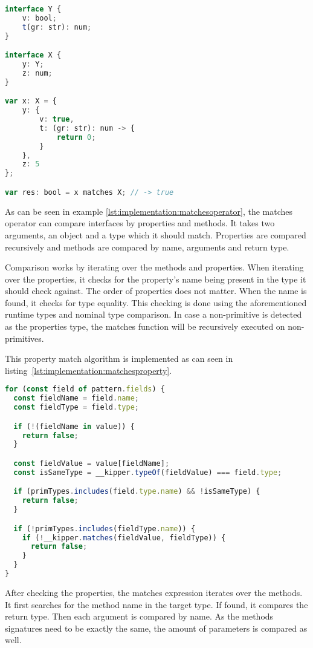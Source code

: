 \begin{lstlisting}[language=Typescript,caption=The Kipper matches operator,label=lst:implementation:matchesoperator]
interface Y {
	v: bool;
	t(gr: str): num;
}

interface X {
	y: Y;
	z: num;
}

var x: X = {
	y: {
		v: true,
		t: (gr: str): num -> {
			return 0;
		}
	},
	z: 5
};

var res: bool = x matches X; // -> true
\end{lstlisting}

As can be seen in example \ref{lst:implementation:matchesoperator}, the matches operator can compare interfaces by properties and methods. It takes two arguments, an object and a type which it should match. Properties are compared recursively and methods are compared by name, arguments and return type.

Comparison works by iterating over the methods and properties. When iterating over the properties, it checks for the property's name being present in the type it should check against. The order of properties does not matter. When the name is found, it checks for type equality. This checking is done using the aforementioned runtime types and nominal type comparison. In case a non-primitive is detected as the properties type, the matches function will be recursively executed on non-primitives.

This property match algorithm is implemented as can seen in listing~\ref{lst:implementation:matchesproperty}.

\begin{lstlisting}[language=Typescript,caption=Matches operator property comparison,label=lst:implementation:matchesproperty]
for (const field of pattern.fields) {
  const fieldName = field.name;
  const fieldType = field.type;

  if (!(fieldName in value)) {
    return false;
  }

  const fieldValue = value[fieldName];
  const isSameType = __kipper.typeOf(fieldValue) === field.type;

  if (primTypes.includes(field.type.name) && !isSameType) {
    return false;
  }

  if (!primTypes.includes(fieldType.name)) {
    if (!__kipper.matches(fieldValue, fieldType)) {
      return false;
    }
  }
}
\end{lstlisting}

After checking the properties, the matches expression iterates over the methods. It first searches for the method name in the target type. If found, it compares the return type. Then each argument is compared by name. As the methods signatures need to be exactly the same, the amount of parameters is compared as well.

